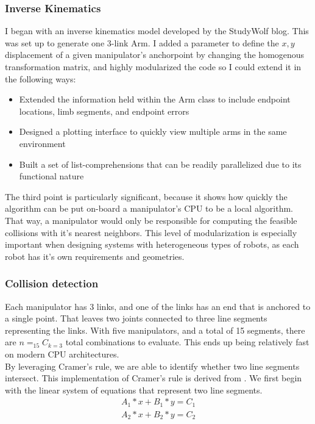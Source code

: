 \documentclass[9pt,twocolumn,twoside]{pnas-new}
\begin{document}
\subsubsection*{Inverse Kinematics}
I began with an inverse kinematics model developed by the StudyWolf blog. This was set up to generate one 3-link Arm. I added a parameter to define the $x,y$ displacement of a given manipulator's anchorpoint by changing the homogenous transformation matrix, and highly modularized the code so I could extend it in the following ways:

\begin{itemize}
  \item Extended the information held within the Arm class to include endpoint locations, limb segments, and endpoint errors
  \item Designed a plotting interface to quickly view multiple arms in the same environment
  \item Built a set of list-comprehensions that can be readily parallelized due to its functional nature
\end{itemize}

The third point is particularly significant, because it shows how quickly the algorithm can be put on-board a manipulator's CPU to be a local algorithm. That way, a manipulator would only be responsible for computing the feasible collisions with it's nearest neighbors. This level of modularization is especially important when designing systems with heterogeneous types of robots, as each robot has it's own requirements and geometries.

\subsubsection*{Collision detection}
Each manipulator has 3 links, and one of the links has an end that is anchored to a single point. That leaves two joints connected to three line segments representing the links. With five manipulators, and a total of 15 segments, there are $n=_{15}C_{k=3}$ total combinations to evaluate. This ends up being relatively fast on modern CPU architectures.\\ 
By leveraging Cramer's rule, we are able to identify whether two line segments intersect. This implementation of Cramer's rule is derived from \cite{stackoverflowanswer}.
We first begin with the linear system of equations that represent two line segments.
\begin{align*}
A_1 * x + B_1 * y = C_1\\
A_2 * x + B_2 * y = C_2
\end{align*}
\end{document}
